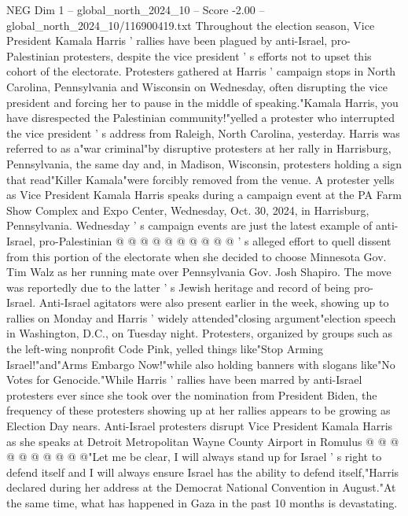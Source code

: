 \begin{textsample}{NEG Dim 1 – global\_north\_2024\_10 – Score -2.00 – global\_north\_2024\_10/116900419.txt}  \label{ex:f1_neg_069}
Throughout the election season, Vice President Kamala Harris ' rallies have been plagued by anti-Israel, pro-Palestinian protesters, despite the vice president ' s efforts not to upset this cohort of the electorate.
Protesters gathered at Harris ' campaign stops in North Carolina, Pennsylvania and Wisconsin on Wednesday, often disrupting the vice president and forcing her to pause in the middle of speaking."Kamala Harris, you have disrespected the Palestinian community!"yelled a protester who interrupted the vice president ' s address from Raleigh, North Carolina, yesterday.
Harris was referred to as a"war criminal"by disruptive protesters at her rally in Harrisburg, Pennsylvania, the same day and, in Madison, Wisconsin, protesters holding a sign that read"Killer Kamala"were forcibly removed from the venue.
A protester yells as Vice President Kamala Harris speaks during a campaign event at the PA Farm Show Complex and Expo Center, Wednesday, Oct. 30, 2024, in Harrisburg, Pennsylvania.
Wednesday ' s campaign events are just the latest example of anti-Israel, pro-Palestinian @ @ @ @ @ @ @ @ @ @ ' s alleged effort to quell dissent from this portion of the electorate when she decided to choose Minnesota Gov.
Tim Walz as her running mate over Pennsylvania Gov.
Josh Shapiro.
The move was reportedly due to the latter ' s Jewish heritage and record of being pro-Israel.
Anti-Israel agitators were also present earlier in the week, showing up to rallies on Monday and Harris ' widely attended"closing argument"election speech in Washington, D.C., on Tuesday night.
Protesters, organized by groups such as the left-wing nonprofit Code Pink, yelled things like"Stop Arming Israel!"and"Arms Embargo Now!"while also holding banners with slogans like"No Votes for Genocide."While Harris ' rallies have been marred by anti-Israel protesters ever since she took over the nomination from President Biden, the frequency of these protesters showing up at her rallies appears to be growing as Election Day nears.
Anti-Israel protesters disrupt Vice President Kamala Harris as she speaks at Detroit Metropolitan Wayne County Airport in Romulus @ @ @ @ @ @ @ @ @ @"Let me be clear, I will always stand up for Israel ' s right to defend itself and I will always ensure Israel has the ability to defend itself,"Harris declared during her address at the Democrat National Convention in August."At the same time, what has happened in Gaza in the past 10 months is devastating.

\end{textsample}
